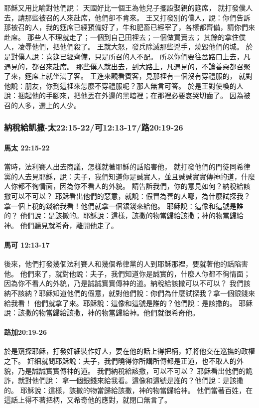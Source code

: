 耶穌又用比喻對他們說：
天國好比一個王為他兒子擺設娶親的筵席，
就打發僕人去，請那些被召的人來赴席，他們卻不肯來。
王又打發別的僕人，說：你們告訴那被召的人，我的筵席已經預備好了，牛和肥畜已經宰了，各樣都齊備，請你們來赴席。
那些人不理就走了；一個到自己田裡去；一個做買賣去；
其餘的拿住僕人，凌辱他們，把他們殺了。
王就大怒，發兵除滅那些兇手，燒毀他們的城。
於是對僕人說：喜筵已經齊備，只是所召的人不配。
所以你們要往岔路口上去，凡遇見的，都召來赴席。
那些僕人就出去，到大路上，凡遇見的，不論善惡都召聚了來，筵席上就坐滿了客。
王進來觀看賓客，見那裡有一個沒有穿禮服的，
就對他說：朋友，你到這裡來怎麼不穿禮服呢？那人無言可答。
於是王對使喚的人說：捆起他的手腳來，把他丟在外邊的黑暗裡；在那裡必要哀哭切齒了。
因為被召的人多，選上的人少。

\subsubsection{納稅給凱撒-太22:15-22/可12:13-17/路20:19-26}
\paragraph{馬太 22:15-22}
當時，法利賽人出去商議，怎樣就著耶穌的話陷害他，
就打發他們的門徒同希律黨的人去見耶穌，說：夫子，我們知道你是誠實人，並且誠誠實實傳神的道，什麼人你都不徇情面，因為你不看人的外貌。
請告訴我們，你的意見如何？納稅給該撒可以不可以？
耶穌看出他們的惡意，就說：假冒為善的人哪，為什麼試探我？
拿一個上稅的錢給我看！他們就拿一個銀錢來給他。
耶穌說：這像和這號是誰的？
他們說：是該撒的。耶穌說：這樣，該撒的物當歸給該撒；神的物當歸給神。
他們聽見就希奇，離開他走了。
\paragraph{馬可 12:13-17}
後來，他們打發幾個法利賽人和幾個希律黨的人到耶穌那裡，要就著他的話陷害他。
他們來了，就對他說：夫子，我們知道你是誠實的，什麼人你都不徇情面；因為你不看人的外貌，乃是誠誠實實傳神的道。納稅給該撒可以不可以？
我們該納不該納？耶穌知道他們的假意，就對他們說：你們為什麼試探我？拿一個銀錢來給我看！
他們就拿了來。耶穌說：這像和這號是誰的？他們說：是該撒的。
耶穌說：該撒的物當歸給該撒，神的物當歸給神。他們就很希奇他。
\paragraph{路加20:19-26}
於是窺探耶穌，打發奸細裝作好人，要在他的話上得把柄，好將他交在巡撫的政權之下。
奸細就問耶穌說：夫子，我們曉得你所講所傳都是正道，也不取人的外貌，乃是誠誠實實傳神的道。
我們納稅給該撒，可以不可以？
耶穌看出他們的詭詐，就對他們說：
拿一個銀錢來給我看。這像和這號是誰的？他們說：是該撒的。
耶穌說：這樣，該撒的物當歸給該撒，神的物當歸給神。
他們當著百姓，在這話上得不著把柄，又希奇他的應對，就閉口無言了。

